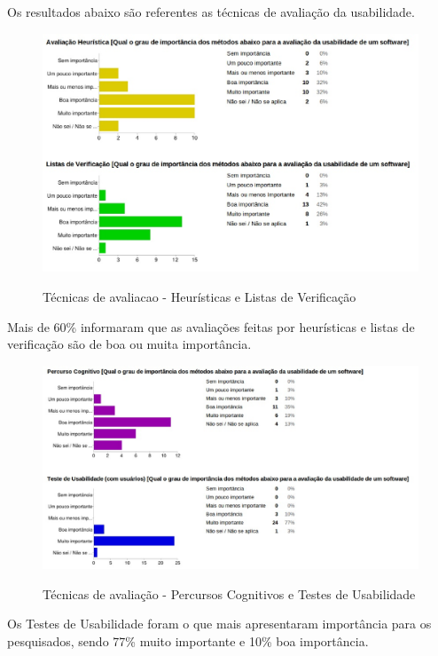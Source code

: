 \newpage

	Os resultados abaixo são referentes as técnicas de avaliação da usabilidade.	
	
	\begin{figure}[!h]
    	\centering
    	\includegraphics[keepaspectratio=true,scale=0.55]
      		{figuras/avalia1.eps}
    	\label{check04}
		\caption{Técnicas de avaliacao - Heurísticas e Listas de Verificação}
	\end{figure}
		
		Mais de 60\% informaram que as avaliações feitas por heurísticas e listas de verificação são de boa ou muita importância.
	
	\begin{figure}[!h]
    	\centering
    	\includegraphics[keepaspectratio=true,scale=0.55]
      		{figuras/avalia2.eps}
    	\label{check04}
		\caption{Técnicas de avaliação - Percursos Cognitivos e Testes de Usabilidade}
	\end{figure}

		Os Testes de Usabilidade foram o que mais apresentaram importância para os pesquisados, sendo 77\% muito importante e 10\% boa importância.	
